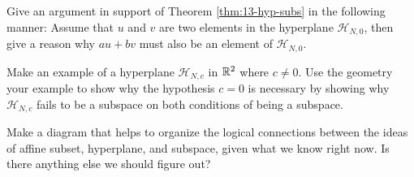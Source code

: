 \documentclass[elementsmain.tex]{subfiles}
\begin{document}
\begin{exercise}\label{ex:13-pf-thm-hyp-subs1}
Give an argument in support of Theorem \ref{thm:13-hyp-subs} in the following manner: Assume that $u$ and $v$ are two elements in the hyperplane $\mathcal{H}_{N,0}$, then give a reason why $au+bv$ must also be an element of $\mathcal{H}_{N,0}$.
\end{exercise}

\begin{exercise}\label{ex:13-pf-thm-hyp-subs2}
Make an example of a hyperplane $\mathcal{H}_{N,c}$ in $\mathbb{R}^2$ where $c\neq 0$. Use the geometry your example to show why the hypothesis $c=0$ is necessary by showing why $\mathcal{H}_{N,c}$ fails to be a subspace on both conditions of being a subspace.
\end{exercise}



\begin{exercise} Make a diagram that helps to organize the logical connections between the ideas of affine subset, hyperplane, and subspace, given what we know right now. Is there anything else we should figure out?
\end{exercise}

\clearpage
\end{document}
